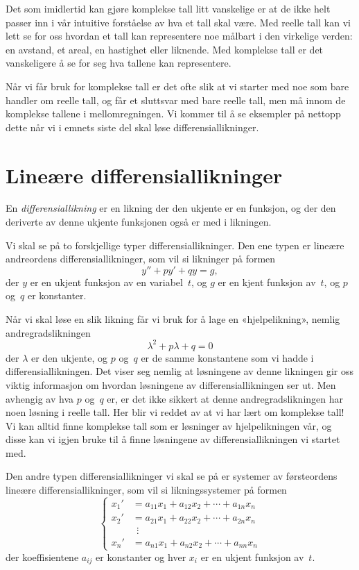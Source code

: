Det som imidlertid kan gjøre komplekse tall litt vanskelige er at de
ikke helt passer inn i vår intuitive forståelse av hva et tall skal
være.  Med reelle tall kan vi lett se for oss hvordan et tall kan
representere noe målbart i den virkelige verden: en avstand, et areal,
en hastighet eller liknende.  Med komplekse tall er det vanskeligere å
se for seg hva tallene kan representere.

Når vi får bruk for komplekse tall er det ofte slik at vi starter med
noe som bare handler om reelle tall, og får et sluttsvar med bare
reelle tall, men må innom de komplekse tallene i mellomregningen.  Vi
kommer til å se eksempler på nettopp dette når vi i emnets siste del
skal løse differensiallikninger.


\section*{Lineære differensiallikninger}

En \emph{differensiallikning} er en likning der den ukjente er en
funksjon, og der den deriverte av denne ukjente funksjonen også er med
i likningen.

Vi skal se på to forskjellige typer differensiallikninger.  Den ene
typen er lineære andreordens differensiallikninger, som vil si
likninger på formen
\[
y'' + p y' + q y = g,
\]
der $y$ er en ukjent funksjon av en variabel~$t$, og $g$ er en kjent
funksjon av~$t$, og $p$ og~$q$ er konstanter.

Når vi skal løse en slik likning får vi bruk for å lage en
«hjelpelikning», nemlig andregradslikningen
\[
\lambda^2 + p \lambda + q = 0
\]
der $\lambda$ er den ukjente, og $p$ og~$q$ er de samme konstantene
som vi hadde i differensiallikningen.  Det viser seg nemlig at
løsningene av denne likningen gir oss viktig informasjon om hvordan
løsningene av differensiallikningen ser ut.  Men avhengig av hva $p$
og~$q$ er, er det ikke sikkert at denne andregradslikningen har noen
løsning i reelle tall.  Her blir vi reddet av at vi har lært om
komplekse tall!  Vi kan alltid finne komplekse tall som er løsninger
av hjelpelikningen vår, og disse kan vi igjen bruke til å finne
løsningene av differensiallikningen vi startet med.

\smallskip
Den andre typen differensiallikninger vi skal se på er systemer av
førsteordens lineære differensiallikninger, som vil si
likningssystemer på formen
\[
\left\{
\begin{aligned}
x_1' &= a_{11} x_1 + a_{12} x_2 + \cdots + a_{1n} x_n \\
x_2' &= a_{21} x_1 + a_{22} x_2 + \cdots + a_{2n} x_n \\
     &\ \ \vdots \\
x_n' &= a_{n1} x_1 + a_{n2} x_2 + \cdots + a_{nn} x_n
\end{aligned}
\right.
\]
der koeffisientene $a_{ij}$ er konstanter og hver $x_i$ er en ukjent
funksjon av~$t$.

